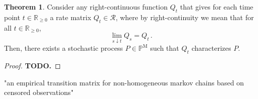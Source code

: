 \documentclass[10pt]{paper}
\theoremstyle{definition}
\newtheorem{theorem}{Theorem}
\newtheorem{definition}{Definition}
\newcommand{\reals}{\mathbb{R}}
\newcommand{\realspos}{\reals_{>0}}
\newcommand{\realsnonneg}{\reals_{\geq 0}}
\newcommand{\processes}{\mathbb{P}}
\newcommand{\mprocesses}{\processes^{\mathrm{M}}}
\newcommand{\norm}[1]{\left\lVert #1 \right\rVert}
\begin{document}

\begin{theorem}\label{theorem:continuous_rate_matrix_has_process}
Consider any right-continuous function $Q_t$ that gives for each time point $t\in\realsnonneg$ a rate matrix $Q_t\in\mathcal{R}$, where by right-continuity we mean that for all $t\in\realsnonneg$,
\begin{equation*}
\lim_{s\downarrow t} Q_s = Q_t\,.
\end{equation*}
Then, there exists a stochastic process $P\in\mprocesses$ such that $Q_t$ characterizes $P$.
\end{theorem}
\begin{proof}
{\bf TODO.}
\end{proof}


"an empirical transition matrix for non-homogeneous markov chains based on censored observations"



\end{document}
